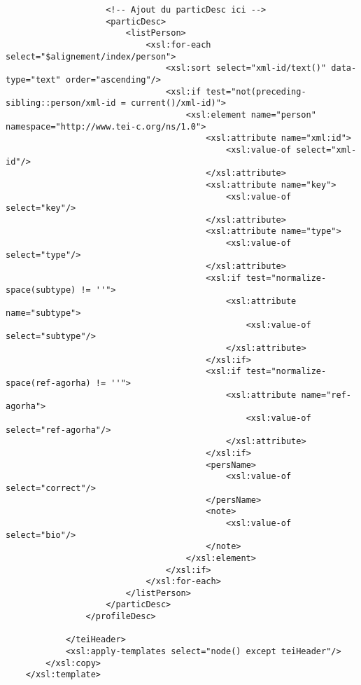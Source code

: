\begin{verbatim}
                    <!-- Ajout du particDesc ici -->
                    <particDesc>
                        <listPerson>
                            <xsl:for-each select="$alignement/index/person">
                                <xsl:sort select="xml-id/text()" data-type="text" order="ascending"/>
                                <xsl:if test="not(preceding-sibling::person/xml-id = current()/xml-id)">
                                    <xsl:element name="person" namespace="http://www.tei-c.org/ns/1.0">
                                        <xsl:attribute name="xml:id">
                                            <xsl:value-of select="xml-id"/>
                                        </xsl:attribute>
                                        <xsl:attribute name="key">
                                            <xsl:value-of select="key"/>
                                        </xsl:attribute>
                                        <xsl:attribute name="type">
                                            <xsl:value-of select="type"/>
                                        </xsl:attribute>
                                        <xsl:if test="normalize-space(subtype) != ''">
                                            <xsl:attribute name="subtype">
                                                <xsl:value-of select="subtype"/>
                                            </xsl:attribute>
                                        </xsl:if>
                                        <xsl:if test="normalize-space(ref-agorha) != ''">
                                            <xsl:attribute name="ref-agorha">
                                                <xsl:value-of select="ref-agorha"/>
                                            </xsl:attribute>
                                        </xsl:if>
                                        <persName>
                                            <xsl:value-of select="correct"/>
                                        </persName>
                                        <note>
                                            <xsl:value-of select="bio"/>
                                        </note>
                                    </xsl:element>
                                </xsl:if>
                            </xsl:for-each>
                        </listPerson>
                    </particDesc>
                </profileDesc>

            </teiHeader>
            <xsl:apply-templates select="node() except teiHeader"/>
        </xsl:copy>
    </xsl:template>
    

\end{verbatim}
